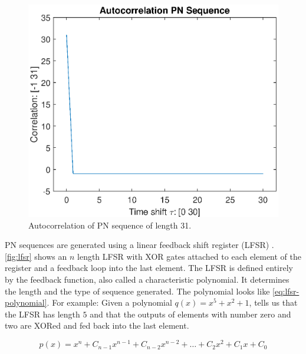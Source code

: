 \begin{figure}[t]
	\centering
	\includegraphics[width=\textwidth]{chapters/cdma-chapters/codes/autocorr-pn.eps}
	\caption{Autocorrelation of PN sequence of length 31.}
	\label{fig:autocorr-pn}
\end{figure}





PN sequences are generated using a linear feedback shift register (LFSR) \cite{Wang:1988:LFS:52007.52024}.
\autoref{fig:lfsr} shows an $n$ length LFSR with XOR gates attached to each element of the register and a feedback loop into the last element. 
The LFSR is defined entirely by the feedback function, also called a characteristic polynomial.
It determines the length and the type of sequence generated.
The polynomial looks like \autoref{eq:lfsr-polynomial}.
For example: Given a polynomial $q(x) = x^5 + x^2 + 1$, tells us that the LFSR has length $5$ and that the outputs of elements with number zero and two are XORed and fed back into the last element. 

\begin{equation}
	\label{eq:lfsr-polynomial}
	p(x) = x^n + C_{n-1} x^{n-1}  + C_{n-2} x^{n-2} + \dotsc + C_{2} x^{2}  + C_{1} x  + C_{0}
\end{equation}

